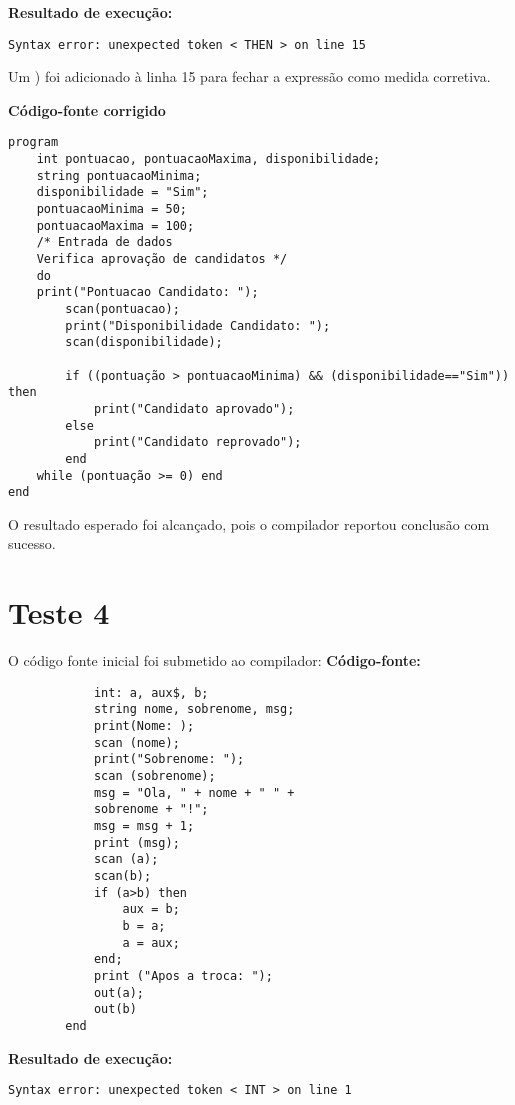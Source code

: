 \textbf{Resultado de execução:}

\begin{lstlisting}
Syntax error: unexpected token < THEN > on line 15
\end{lstlisting}

Um ) foi adicionado à linha 15 para fechar a expressão como medida corretiva.

\textbf{Código-fonte corrigido}

\begin{lstlisting}
program
	int pontuacao, pontuacaoMaxima, disponibilidade;
	string pontuacaoMinima;
	disponibilidade = "Sim";
	pontuacaoMinima = 50;
	pontuacaoMaxima = 100;
	/* Entrada de dados
	Verifica aprovação de candidatos */
	do
	print("Pontuacao Candidato: ");
		scan(pontuacao);
		print("Disponibilidade Candidato: ");
		scan(disponibilidade);

		if ((pontuação > pontuacaoMinima) && (disponibilidade=="Sim")) then
			print("Candidato aprovado");
		else
			print("Candidato reprovado");
		end
	while (pontuação >= 0) end
end
\end{lstlisting}

O resultado esperado foi alcançado, pois o compilador reportou conclusão com sucesso.

\newpage


\section{\textbf{Teste 4}}
    
    O código fonte inicial foi submetido ao compilador:
        \textbf{Código-fonte:}
        
        \begin{lstlisting}
    		int: a, aux$, b;
        	string nome, sobrenome, msg;
        	print(Nome: );
        	scan (nome);
        	print("Sobrenome: ");
        	scan (sobrenome);
        	msg = "Ola, " + nome + " " +
        	sobrenome + "!";
        	msg = msg + 1;
        	print (msg);
        	scan (a);
        	scan(b);
        	if (a>b) then
        		aux = b;
        		b = a;
        		a = aux;
        	end;
        	print ("Apos a troca: ");
        	out(a);
        	out(b)
        end
        \end{lstlisting}
        
        \textbf{Resultado de execução:}
        
 \begin{lstlisting}
Syntax error: unexpected token < INT > on line 1
\end{lstlisting}

